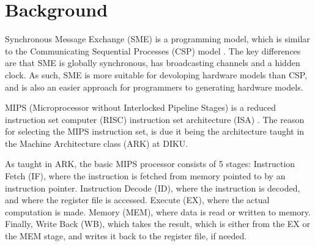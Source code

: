 \documentclass[a4paper]{article}
\begin{document}
\maketitle



\section*{Background}
Synchronous Message Exchange (SME) \cite{sme} is a programming model, which is
similar to the Communicating Sequential Processes (CSP) model \cite{csp}. The
key differences are that SME is globally synchronous, has broadcasting channels
and a hidden clock. As such, SME is more suitable for devoloping hardware
models than CSP, and is also an easier approach for programmers to generating
hardware models.

MIPS (Microprocessor without Interlocked Pipeline Stages) is a reduced
instruction set computer (RISC) instruction set architecture (ISA) \cite{ark}.
The reason for selecting the MIPS instruction set, is due it being the
architecture taught in the Machine Architecture class (ARK) at DIKU.

As taught in ARK, the basic MIPS processor consists of 5 stages: Instruction
Fetch (IF), where the instruction is fetched from memory pointed to by an
instruction pointer. Instruction Decode (ID), where the instruction is decoded,
and where the register file is accessed. Execute (EX), where the actual
computation is made. Memory (MEM), where data is read or written to memory.
Finally, Write Back (WB), which takes the result, which is either from the EX
or the MEM stage, and writes it back to the register file, if needed.
\end{document}

